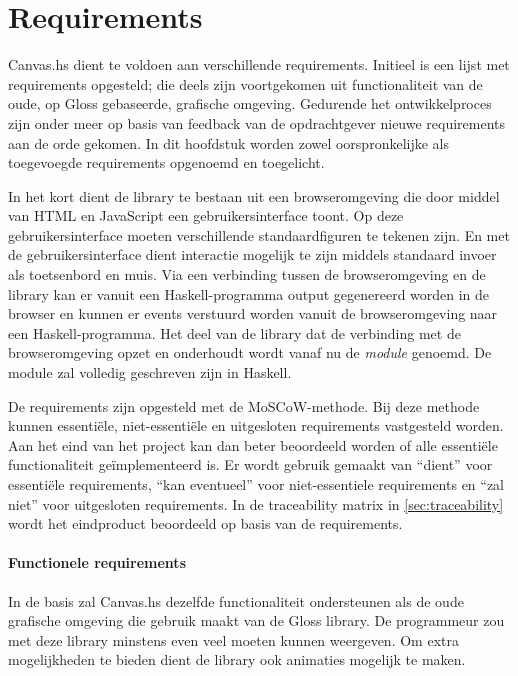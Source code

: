 \chapter{Requirements} \label{hoofdstuk:requirements}
Canvas.hs dient te voldoen aan verschillende requirements. Initieel is een lijst met requirements opgesteld; die deels zijn voortgekomen uit functionaliteit van de oude, op Gloss gebaseerde, grafische omgeving. Gedurende het ontwikkelproces zijn onder meer op basis van feedback van de opdrachtgever nieuwe requirements aan de orde gekomen. In dit hoofdstuk worden zowel oorspronkelijke als toegevoegde requirements opgenoemd en toegelicht.

In het kort dient de library te bestaan uit een browseromgeving die door middel van HTML en JavaScript een gebruikersinterface toont. Op deze gebruikersinterface moeten verschillende standaardfiguren te tekenen zijn. En met de gebruikersinterface dient interactie mogelijk te zijn middels standaard invoer als toetsenbord en muis. Via een verbinding tussen de browseromgeving en de library kan er vanuit een Haskell-programma output gegenereerd worden in de browser en kunnen er events verstuurd worden vanuit de browseromgeving naar een Haskell-programma. Het deel van de library dat de verbinding met de browseromgeving opzet en onderhoudt wordt vanaf nu de \emph{module} genoemd. De module zal volledig geschreven zijn in Haskell.

De requirements zijn opgesteld met de MoSCoW-methode. Bij deze methode kunnen essenti\"ele, niet-essenti\"ele en uitgesloten requirements vastgesteld worden. Aan het eind van het project kan dan beter beoordeeld worden of alle essenti\"ele functionaliteit ge\"implementeerd is. Er wordt gebruik gemaakt van ``dient'' voor essenti\"ele requirements, ``kan eventueel'' voor niet-essentiele requirements en ``zal niet'' voor uitgesloten requirements. In de traceability matrix in \autoref{sec:traceability} wordt het eindproduct beoordeeld op basis van de requirements.

\subsubsection{Functionele requirements}
In de basis zal Canvas.hs dezelfde functionaliteit ondersteunen als de oude grafische omgeving die gebruik maakt van de Gloss library. De programmeur zou met deze library minstens even veel moeten kunnen weergeven. Om extra mogelijkheden te bieden dient de library ook animaties mogelijk te maken.

